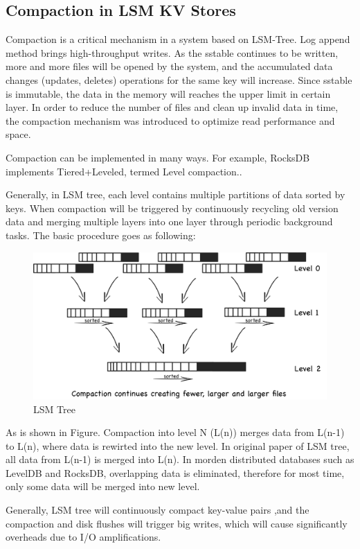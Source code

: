 \documentclass[a4paper,10pt,twoside]{article}
\begin{document}
\subsection{Compaction in LSM KV Stores}

Compaction is a critical mechanism in a system based on LSM-Tree. 
Log append method brings high-throughput writes. 
As the sstable continues to be written, more and more files will be opened by the system, and the accumulated data changes (updates, deletes) operations for the same key will increase. 
Since sstable is immutable, the data in the memory will reaches the upper limit in certain layer.
In order to reduce the number of files and clean up invalid data in time, the compaction mechanism was introduced to optimize read performance and space.
\par
Compaction can be implemented in many ways. For example, RocksDB implements Tiered+Leveled, termed Level compaction.\cite{RocksDB_compaction_algo1}. 
\par
Generally, in LSM tree, each level contains multiple partitions of data sorted by keys. When  compaction will be triggered by continuously recycling old version data and merging multiple layers into one layer through periodic background tasks.
The basic procedure goes as following:
\begin{figure}[h]
    \centering
	\includegraphics[scale=0.3]{LSM_Tree1.png}
    \caption{LSM Tree}
    \label{fig:mesh1}
\end{figure}
\par
As is shown in Figure. Compaction into level N (L(n)) merges data from L(n-1) to L(n), where data is rewirted into the new level. 
In original paper of LSM tree, all data from L(n-1) is merged into L(n). 
In morden distributed databases such as LevelDB and RocksDB, overlapping data is eliminated, therefore for most time, only some data will be merged into new level.
\par
Generally, LSM tree will continuously compact key-value pairs ,and the compaction and disk flushes will trigger big writes, which will cause significantly overheads due to I/O amplifications.
\end{document}
